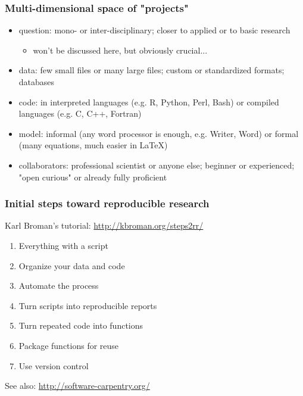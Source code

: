 \documentclass[c]{beamer} %
\begin{document}
\begin{frame}
  \frametitle{Multi-dimensional space of "projects"}
  \begin{itemize}
  \item \alert{question}: mono- or inter-disciplinary; closer to applied or to basic research
    \begin{itemize}
    \item won't be discussed here, but obviously crucial...
    \end{itemize}
    \medskip
    \pause
  \item \alert{data}: few small files or many large files; custom or standardized formats; databases
    \medskip
    \pause
  \item \alert{code}: in interpreted languages (e.g. R, Python, Perl, Bash) or compiled languages (e.g. C, C++, Fortran)
    \medskip
    \pause
  \item \alert{model}: informal (any word processor is enough, e.g. Writer, Word) or formal (many equations, much easier in LaTeX)
    \medskip
    \pause
  \item \alert{collaborators}: professional scientist or anyone else; beginner or experienced; "open curious" or already fully proficient
  \end{itemize}
\end{frame}

\begin{frame}
  \frametitle{Initial steps toward reproducible research}
  Karl Broman's tutorial: \url{http://kbroman.org/steps2rr/}
  
  \bigskip
  
  \begin{enumerate}
  \item Everything with a script
  \item Organize your data and code
  \item Automate the process
  \item Turn scripts into reproducible reports
  \item Turn repeated code into functions
  \item Package functions for reuse
  \item Use version control
  \end{enumerate}
  
  \bigskip
  \pause
  
  See also: \url{http://software-carpentry.org/}
\end{frame}
\end{document}
